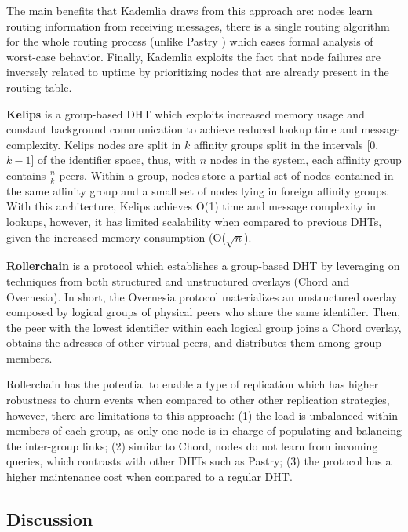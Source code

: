 The main benefits that Kademlia draws from this approach are: nodes learn routing information from receiving messages, there is a single routing algorithm for the whole routing process (unlike Pastry \cite{rowstron2001pastry}) which eases formal analysis of worst-case behavior. Finally, Kademlia exploits the fact that node failures are inversely related to uptime by prioritizing nodes that are already present in the routing table.

\textbf{Kelips} \cite{gupta2003kelips} is a group-based DHT which exploits increased memory usage and constant background communication to achieve reduced lookup time and message complexity. Kelips nodes are split in $k$ affinity groups split in the intervals [0,$k-1$] of the identifier space, thus, with $n$ nodes in the system, each affinity group contains $\frac{n}{k}$ peers. Within a group, nodes store a partial set of nodes contained in the same affinity group and a small set of nodes lying in foreign affinity groups. With this architecture, Kelips achieves O(1) time and message complexity in lookups, however, it has limited scalability when compared to previous DHTs, given the increased memory consumption (O($\sqrt{n}$).

\textbf{Rollerchain} \cite{rollerchain} is a protocol which establishes a group-based DHT by leveraging on techniques from both structured and unstructured  overlays (Chord and Overnesia). In short, the Overnesia protocol materializes an unstructured overlay composed by logical groups of physical peers who share the same identifier. Then, the peer with the lowest identifier within each logical group joins a Chord overlay, obtains the adresses of other virtual peers, and distributes them among group members.

Rollerchain has the potential to enable a type of replication which has higher robustness to churn events when compared to other other replication strategies, however, there are limitations to this approach: (1) the load is unbalanced within members of each group, as only one node  is in charge of populating and balancing the inter-group links; (2) similar to Chord, nodes do not learn from incoming queries, which contrasts with other DHTs such as Pastry; (3) the protocol has a higher maintenance cost when compared to a regular DHT.

\subsection{Discussion}

